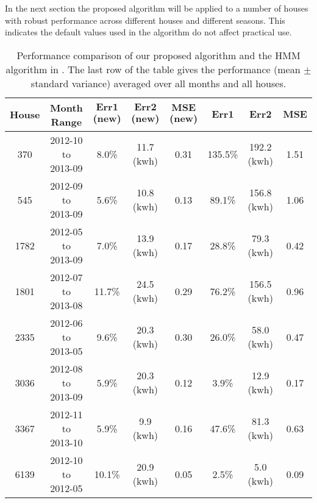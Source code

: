 \documentclass[conference]{IEEEtran}
\begin{document}
In the next section the proposed algorithm will be applied to a number of houses with robust performance across different houses and different seasons. This indicates the default values used in the algorithm do not affect practical use.







\begin{table*}[thp]
\caption{Performance comparison of our proposed algorithm and the HMM algorithm in \cite{parson2012non}. The last row of the table gives the performance (mean $\pm$ standard variance) averaged over all months and all houses.}
\label{Table1}
\centering
\begin{tabular}{c|c|c|c|c| c|c|c}
\hline\hline
\textbf{House }            &  \textbf{Month Range}  &  $\mathrm{\textbf{Err1}}$ (new)    &   $\mathrm{\textbf{Err2}}$ (new)        & $\mathrm{\textbf{MSE}}$ (new)    & $\mathrm{\textbf{Err1}}$ \cite{parson2012non}   &$\mathrm{\textbf{Err2}}$ \cite{parson2012non}  &  $\mathrm{\textbf{MSE}}$ \cite{parson2012non} \\
\hline
370                    & 2012-10 to 2013-09     & 8.0\%       & 11.7 (kwh) & 0.31   &        135.5\%           &192.2 (kwh) &    1.51        \\ \hline
545                   & 2012-09 to 2013-09   &  5.6\%        & 10.8 (kwh) &  0.13     &    89.1\%          & 156.8 (kwh)  &    1.06             \\    \hline
1782                   &   2012-05 to 2013-09    &   7.0\%      & 13.9 (kwh) &  0.17      &     28.8\%          & 79.3 (kwh)  &   0.42           \\ \hline
1801                  &  2012-07 to 2013-08  & 11.7\%         & 24.5 (kwh) &   0.29    &    76.2\%        & 156.5 (kwh) &   0.96            \\ \hline
2335                   & 2012-06 to 2013-05     &  9.6\%     & 20.3 (kwh) & 0.30    &       26.0\%           &58.0 (kwh) &     0.47    \\  \hline
3036                  & 2012-08 to 2013-09    &  5.9\%         & 20.3 (kwh) &  0.12     &     3.9\%         &12.9 (kwh) &   0.17          \\ \hline
3367                  & 2012-11 to 2013-10   &   5.9\%        & 9.9 (kwh) &  0.16     &        47.6\%       &81.3 (kwh) &  0.63              \\  \hline
6139                  & 2012-10 to 2012-05    &  10.1\%       & 20.9 (kwh) &  0.05       &      2.5\%        &5.0 (kwh) &    0.09        \\ \hline

\end{tabular}
\end{table*}
\end{document}
